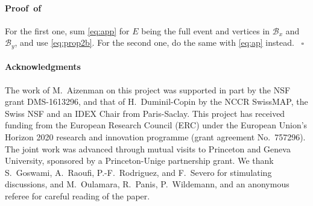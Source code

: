 \documentclass[a4paper,oneside,11pt]{article}
\numberwithin{equation}{section}
\numberwithin{equation}{section}
\numberwithin{equation}{section}
\newenvironment{proof}[1][\relax]%
  {\paragraph{Proof\ifx#1\relax\else~of #1\fi}}%
  {~\hfill$\square$\par\bigskip}
\newcommand{\calB}{\mathcal{B}}
\begin{document}
\begin{proof}
For the first one, sum \eqref{eq:app} for $E$ being the full event and vertices in $\calB_x$ and $\calB_y$, and use \eqref{eq:prop2b}. For the second one, do the same with \eqref{eq:ap} instead.
\end{proof}



 \paragraph{Acknowledgments}  The work of M.~Aizenman on this project was supported in part by the NSF grant DMS-1613296, and that of H.~Duminil-Copin by the NCCR SwissMAP, the Swiss NSF and an IDEX Chair from Paris-Saclay. This project has received funding from the European Research Council (ERC) under the European Union's Horizon 2020 research and innovation programme (grant agreement No.~757296).  The joint work was advanced through mutual visits to Princeton and Geneva University,  sponsored by a  Princeton-Unige partnership grant.  We thank S.~Goswami, A.~Raoufi, P.-F.~Rodriguez, and F.~Severo for stimulating discussions, and M.~Oulamara, R.~Panis, P.~Wildemann, and an anonymous referee for careful reading of the paper.
\end{document}
